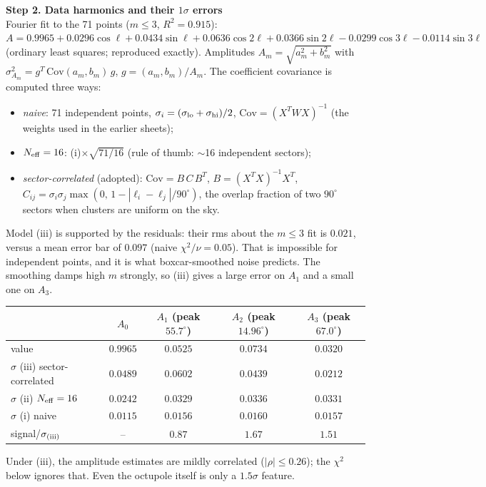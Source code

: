 \documentclass[10pt]{article}
\begin{document}
\medskip\textbf{Step 2. Data harmonics and their $1\sigma$ errors}\\
Fourier fit to the 71 points ($m\le3$, $R^2=0.915$):
$A=0.9965+0.0296\cos\ell+0.0434\sin\ell+0.0636\cos2\ell+0.0366\sin2\ell-0.0299\cos3\ell-0.0114\sin3\ell$ (ordinary least squares; reproduced exactly).
Amplitudes $A_m=\sqrt{a_m^2+b_m^2}$ with $\sigma_{A_m}^2=g^{T}\,\mathrm{Cov}(a_m,b_m)\,g$, $g=(a_m,b_m)/A_m$. The coefficient covariance is computed three ways:
\begin{itemize}\setlength{\itemsep}{0pt}
\item[(i)] \emph{naive}: 71 independent points, $\sigma_i=(\sigma_{\rm lo}+\sigma_{\rm hi})/2$, $\mathrm{Cov}=(X^TWX)^{-1}$ (the weights used in the earlier sheets);
\item[(ii)] \emph{$N_{\rm eff}=16$}: (i)$\times\sqrt{71/16}$ (rule of thumb: $\sim$16 independent sectors);
\item[(iii)] \emph{sector-correlated} (adopted): $\mathrm{Cov}=B\,C\,B^T$, $B=(X^TX)^{-1}X^T$, $C_{ij}=\sigma_i\sigma_j\max(0,\,1-|\ell_i-\ell_j|/90^\circ)$, the overlap fraction of two $90^\circ$ sectors when clusters are uniform on the sky.
\end{itemize}
Model (iii) is supported by the residuals: their rms about the $m\le3$ fit is $0.021$, versus a mean error bar of $0.097$ (naive $\chi^2/\nu=0.05$). That is impossible for independent points, and it is what boxcar-smoothed noise predicts. The smoothing damps high $m$ strongly, so (iii) gives a large error on $A_1$ and a small one on $A_3$.
\begin{center}\small
\begin{tabular}{lcccc}\toprule
 & $A_0$ & $A_1$ (peak $55.7^\circ$) & $A_2$ (peak $14.96^\circ$) & $A_3$ (peak $67.0^\circ$)\\\midrule
value & $0.9965$ & $0.0525$ & $0.0734$ & $0.0320$\\
$\sigma$ (iii) sector-correlated & $0.0489$ & $0.0602$ & $0.0439$ & $0.0212$\\
$\sigma$ (ii) $N_{\rm eff}=16$ & $0.0242$ & $0.0329$ & $0.0336$ & $0.0331$\\
$\sigma$ (i) naive & $0.0115$ & $0.0156$ & $0.0160$ & $0.0157$\\
signal/$\sigma_{\rm (iii)}$ & -- & $0.87$ & $1.67$ & $1.51$\\\bottomrule
\end{tabular}
\end{center}
Under (iii), the amplitude estimates are mildly correlated ($|\rho|\le0.26$); the $\chi^2$ below ignores that. Even the octupole itself is only a $1.5\sigma$ feature.
\end{document}
